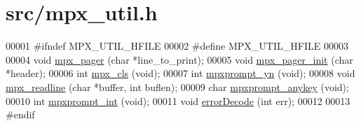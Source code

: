 \hypertarget{mpx__util_8h_source}{
\section{src/mpx\_\-util.h}
}

\begin{DoxyCode}
00001 \textcolor{preprocessor}{#ifndef MPX\_UTIL\_HFILE}
00002 \textcolor{preprocessor}{}\textcolor{preprocessor}{#define MPX\_UTIL\_HFILE}
00003 \textcolor{preprocessor}{}
00004 \textcolor{keywordtype}{void}    \hyperlink{mpx__util_8c_a9e59881f10bd91d7255f18f205e101e6}{mpx_pager}               (\textcolor{keywordtype}{char} *line\_to\_print);
00005 \textcolor{keywordtype}{void}    \hyperlink{mpx__util_8c_a60afdb7496b6ff469c6b98d2ecde15ed}{mpx_pager_init}          (\textcolor{keywordtype}{char} *header);
00006 \textcolor{keywordtype}{int}     \hyperlink{mpx__util_8c_a8cf3281978ba1652fd5d643e1a41f70b}{mpx_cls}                 (\textcolor{keywordtype}{void});
00007 \textcolor{keywordtype}{int}     \hyperlink{mpx__util_8c_a8e31250a20e8bc8e7106f5a37c391199}{mpxprompt_yn}            (\textcolor{keywordtype}{void});
00008 \textcolor{keywordtype}{void}    \hyperlink{mpx__util_8c_a781169ab05ad54c0d37253d73060b77f}{mpx_readline}            (\textcolor{keywordtype}{char} *buffer, \textcolor{keywordtype}{int} buflen);
00009 \textcolor{keywordtype}{char}    \hyperlink{mpx__util_8c_a338d01dfe3c80732c00450203c85b964}{mpxprompt_anykey}        (\textcolor{keywordtype}{void});
00010 \textcolor{keywordtype}{int}     \hyperlink{mpx__util_8c_aacc3dfe470919b0bd1133bce90383e18}{mpxprompt_int}           (\textcolor{keywordtype}{void});
00011 \textcolor{keywordtype}{void}    \hyperlink{mpx__util_8c_a849eaf878bb59c0ed185a00d281047e9}{errorDecode}             (\textcolor{keywordtype}{int} err);
00012 
00013 \textcolor{preprocessor}{#endif}
\end{DoxyCode}
